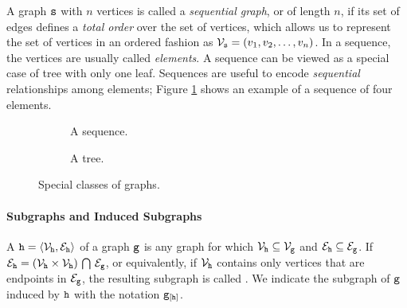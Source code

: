 A graph $\mathtt{s}$ with $n$ vertices is called a \emph{sequential graph}, or  of length $n$, if its set of edges defines a \emph{total order} over the set of vertices, which allows us to represent the set of vertices in an ordered fashion as $\Nodes{s} = (v_1, v_2, \ldots, v_n)$. In a sequence, the vertices are usually called \emph{elements}. A sequence can be viewed as a special case of tree with only one leaf. Sequences are useful to encode \emph{sequential} relationships among elements; Figure \ref{fig:sequence} shows an example of a sequence of four elements.
\begin{figure*}
    \begin{subfigure}[b]{0.60\linewidth}
        \centering
        \resizebox{.8\textwidth}{!}{}
        \caption{A sequence.}
        \label{fig:sequence}
    \end{subfigure}
    \begin{subfigure}[b]{0.39\linewidth}
        \centering
        \resizebox{.70\textwidth}{!}{}
        \caption{A tree.}
        \label{fig:tree}
    \end{subfigure}
    \caption{Special classes of graphs.}
\end{figure*}

\paragraph{Subgraphs and Induced Subgraphs} A 
$\Graph{h} = \langle \Nodes{h}, \Edges{h} \rangle$ of a graph $\mathtt{g}$ is any graph for which $\Nodes{h} \subseteq \Nodes{g}$ and  $\Edges{h} \subseteq \Edges{g}$. If $\Edges{h} = (\Nodes{h} \times \Nodes{h}) \Inter \Edges{g}$, or equivalently, if $\Nodes{h}$ contains only vertices that are endpoints in $\Edges{g}$, the resulting subgraph is called . We indicate the subgraph of $\mathtt{g}$ induced by $\mathtt{h}$ with the notation $\mathtt{g}_{[\mathtt{h}]}$.

